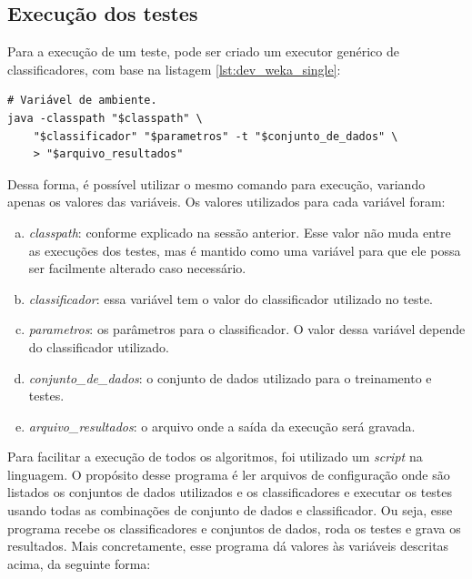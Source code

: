 \subsection{Execução dos testes}

Para a execução de um teste, pode ser criado um executor genérico de classificadores, com base na listagem \ref{lst:dev_weka_single}:

\vspace{0.5cm}
\begin{lstlisting}[caption=Execução genérica de um teste, label=lst:dev_weka_template]
# Variável de ambiente.
java -classpath "$classpath" \
    "$classificador" "$parametros" -t "$conjunto_de_dados" \
    > "$arquivo_resultados"
\end{lstlisting}
\vspace{0.5cm}

Dessa forma, é possível utilizar o mesmo comando para execução, variando apenas os valores das variáveis. Os valores utilizados para cada variável foram:

\begin{enumerate}[a)]
    \item \emph{classpath}: conforme explicado na sessão anterior. Esse valor não muda entre as execuções dos testes, mas é mantido como uma variável para que ele possa ser facilmente alterado caso necessário.
    \item \emph{classificador}: essa variável tem o valor do classificador utilizado no teste.
    \item \emph{parametros}: os parâmetros para o classificador. O valor dessa variável depende do classificador utilizado.
    \item \emph{conjunto\_de\_dados}: o conjunto de dados utilizado para o treinamento e testes.
    \item \emph{arquivo\_resultados}: o arquivo onde a saída da execução será gravada.
\end{enumerate}

Para facilitar a execução de todos os algoritmos, foi utilizado um \emph{script} na linguagem. O propósito desse programa é ler arquivos de configuração onde são listados os conjuntos de dados utilizados e os classificadores e executar os testes usando todas as combinações de conjunto de dados e classificador. Ou seja, esse programa recebe os classificadores e conjuntos de dados, roda os testes e grava os resultados. Mais concretamente, esse programa dá valores às variáveis descritas acima, da seguinte forma:

